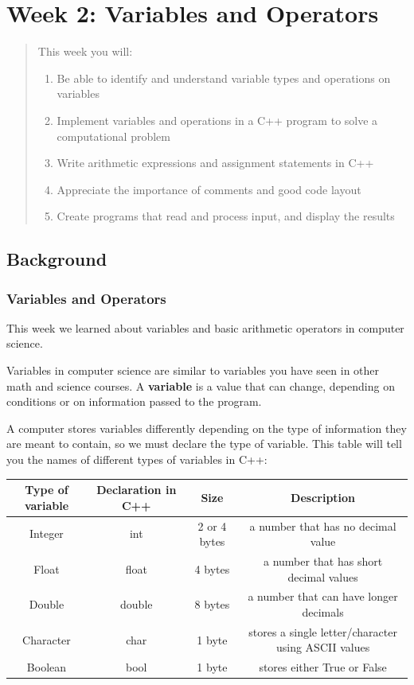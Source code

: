 \chapter*{Week 2: Variables and Operators}
\setcounter{chapter}{2}
\setcounter{section}{0}

\begin{abstract}
This week you will:
\begin{enumerate}
    \item Be able to identify and understand variable types and operations on variables
    \item Implement variables and operations in a C++ program to solve a computational problem
    \item Write arithmetic expressions and assignment statements in C++
    \item Appreciate the importance of comments and good code layout
    \item Create programs that read and process input, and display the results

\end{enumerate}
    
\end{abstract}

\section{Background}
\subsection{Variables and Operators}
This week we learned about variables and basic arithmetic operators in computer science. 

Variables in computer science are similar to variables you have seen in other math and science courses. A \textbf{variable} is a value that can change, depending on conditions or on information passed to the program.

A computer stores variables differently depending on the type of information they are meant to contain, so we must declare the type of variable. This table will tell you the names of different types of variables in C++:

\begin{table}[H]
    \centering
    \begin{tabular}{c|c|c|c}\hline
         Type of variable & Declaration in C++ & Size & Description \\\hline
         Integer & int & 2 or 4 bytes & a number that has no decimal value \\
         Float & float & 4 bytes & a number that has short decimal values \\
         Double & double & 8 bytes & a number that can have longer decimals \\
         Character & char & 1 byte & stores a single letter/character using ASCII values \\
         Boolean & bool & 1 byte & stores either True or False 
    \end{tabular}
\end{table}

